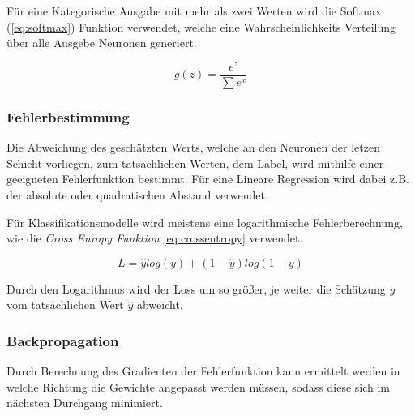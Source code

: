 \vspace{1cm}

\begin{minipage}{0.5\textwidth}
    \centering
    \label{plot:relu}
    
\end{minipage}
\begin{minipage}{0.5\textwidth}
    \centering
    \label{plot:sigmoid}
    
\end{minipage}

\vspace{1cm}


Für eine Kategorische Ausgabe mit mehr als zwei Werten wird 
die Softmax (\ref{eq:softmax}) Funktion verwendet, welche eine Wahrscheinlichkeits 
Verteilung über alle Ausgebe Neuronen generiert.

\begin{equation}
    \label{eq:softmax}
    g(z) = \frac{e^{z}}{\sum e^{x}}
\end{equation}


\subsubsection{Fehlerbestimmung}
Die Abweichung des geschätzten Werts, welche an den Neuronen der letzen Schicht 
vorliegen, zum tatsächlichen Werten, dem Label, wird mithilfe einer geeigneten
Fehlerfunktion bestimmt. Für eine Lineare Regression wird dabei z.B. 
der absolute oder quadratischen Abstand verwendet.

Für Klassifikationsmodelle wird meistens eine logarithmische Fehlerberechnung, wie 
die \textit{Cross Enropy Funktion} \ref{eq:crossentropy} verwendet.

\begin{equation}
    \label{eq:crossentropy}
    L = \hat{y}log(y) + (1 - \hat{y})log(1 - y)
\end{equation}

Durch den Logarithmus wird der Loss um so größer, je weiter die Schätzung $y$ vom 
tatsächlichen Wert $\hat{y}$ abweicht.


\subsubsection{Backpropagation}

Durch Berechnung des Gradienten der Fehlerfunktion kann ermittelt 
werden in welche Richtung die Gewichte angepasst werden müssen,
sodass diese sich im nächsten Durchgang minimiert.

